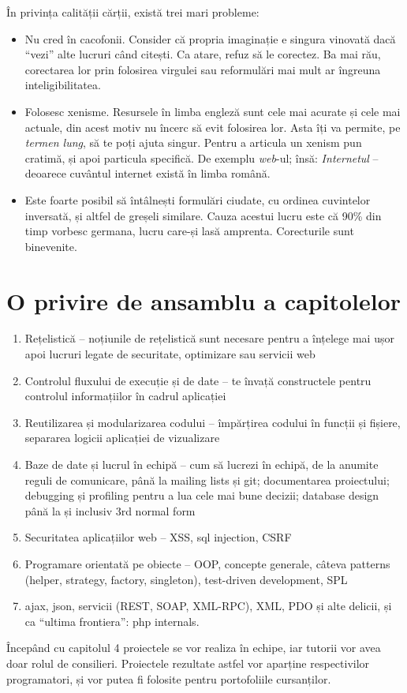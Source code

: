 În privința calității cărții, există trei mari probleme:
\begin{itemize}
\item Nu cred în cacofonii. Consider că propria imaginație e singura vinovată
dacă ``vezi'' alte lucruri când citești. Ca atare, refuz să le corectez.
Ba mai rău, corectarea lor prin folosirea virgulei sau reformulări mai mult
ar îngreuna inteligibilitatea.
\item Folosesc xenisme. Resursele în limba engleză sunt cele mai acurate și
cele mai actuale, din acest motiv nu încerc să evit folosirea lor.
Asta îți va permite, pe \textit{termen lung}, să te poți ajuta singur. Pentru a
articula un xenism pun cratimă, și apoi particula specifică. De exemplu
\textsl{web}-ul; însă: \textit{Internetul} -- deoarece cuvântul internet există în
limba română.
\item Este foarte posibil să întâlnești formulări ciudate, cu ordinea
cuvintelor inversată, și altfel de greșeli similare. Cauza acestui lucru este că
90\% din timp vorbesc germana, lucru care-și lasă amprenta.
Corecturile sunt binevenite.
\end{itemize}

\section*{O privire de ansamblu a capitolelor}
{}

\begin{enumerate}
\item Rețelistică -- noțiunile de rețelistică sunt necesare pentru a înțelege mai
ușor apoi lucruri legate de securitate, optimizare sau servicii web
\item Controlul fluxului de execuție și de date -- te învață constructele pentru
controlul informațiilor în cadrul aplicației
\item Reutilizarea și modularizarea codului -- împărțirea codului în funcții și
fișiere, separarea logicii aplicației de vizualizare
\item Baze de date și lucrul în echipă -- cum să lucrezi în echipă, de la anumite
reguli de comunicare, până la mailing lists și git; documentarea proiectului;
debugging și profiling pentru a lua cele mai bune decizii; database design până
la și inclusiv 3rd normal form
\item Securitatea aplicațiilor web -- XSS, sql injection, CSRF
\item Programare orientată pe obiecte -- OOP, concepte generale, câteva patterns
(helper, strategy, factory, singleton), test-driven development, SPL
\item ajax, json, servicii (REST, SOAP, XML-RPC), XML, PDO și alte delicii, și ca
``ultima frontiera'': php internals.
\end{enumerate}

Începând cu capitolul 4 proiectele se vor realiza în echipe, iar tutorii vor avea
doar rolul de consilieri. Proiectele rezultate astfel vor aparține respectivilor
programatori, și vor putea fi folosite pentru portofoliile cursanților.

